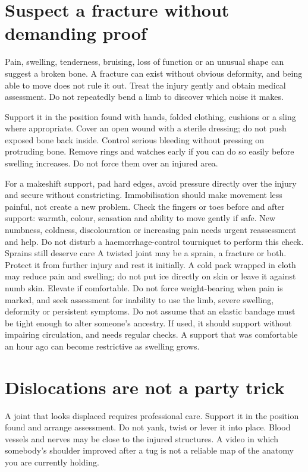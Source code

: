 \documentclass[10pt,openright]{book}
\begin{document}
\section*{Suspect a fracture without demanding proof}
Pain, swelling, tenderness, bruising, loss of function or an unusual shape can suggest a broken bone. A fracture can exist without obvious deformity, and being able to move does not rule it out. Treat the injury gently and obtain medical assessment. Do not repeatedly bend a limb to discover which noise it makes.

Support it in the position found with hands, folded clothing, cushions or a sling where appropriate. Cover an open wound with a sterile dressing; do not push exposed bone back inside. Control serious bleeding without pressing on protruding bone. Remove rings and watches early if you can do so easily before swelling increases. Do not force them over an injured area.

For a makeshift support, pad hard edges, avoid pressure directly over the injury and secure without constricting. Immobilisation should make movement less painful, not create a new problem. Check the fingers or toes before and after support: warmth, colour, sensation and ability to move gently if safe. New numbness, coldness, discolouration or increasing pain needs urgent reassessment and help. Do not disturb a haemorrhage-control tourniquet to perform this check. Sprains still deserve care A twisted joint may be a sprain, a fracture or both. Protect it from further injury and rest it initially. A cold pack wrapped in cloth may reduce pain and swelling; do not put ice directly on skin or leave it against numb skin. Elevate if comfortable. Do not force weight-bearing when pain is marked, and seek assessment for inability to use the limb, severe swelling, deformity or persistent symptoms. Do not assume that an elastic bandage must be tight enough to alter someone's ancestry. If used, it should support without impairing circulation, and needs regular checks. A support that was comfortable an hour ago can become restrictive as swelling grows.

\section*{Dislocations are not a party trick}
A joint that looks displaced requires professional care. Support it in the position found and arrange assessment. Do not yank, twist or lever it into place. Blood vessels and nerves may be close to the injured structures. A video in which somebody's shoulder improved after a tug is not a reliable map of the anatomy you are currently holding.
\end{document}
